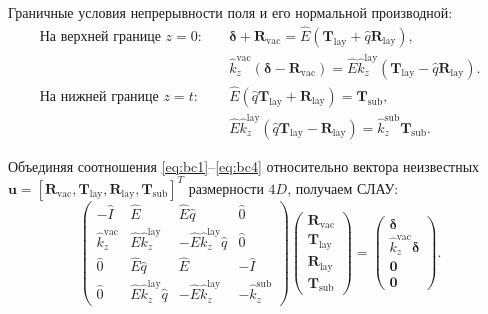 \documentclass[a4paper,11pt]{article}
\begin{document}
Граничные условия непрерывности поля и его нормальной производной:
\begin{align}
\text{На верхней границе } z = 0: & \quad \boldsymbol{\delta} + \mathbf{R}_{\text{vac}} = \hat{E} (\mathbf{T}_{\text{lay}} + \hat{q} \mathbf{R}_{\text{lay}}), \label{eq:bc1} \\
& \quad \hat{k}_{z}^{\text{vac}} (\boldsymbol{\delta} - \mathbf{R}_{\text{vac}}) = \hat{E} \hat{k}_{z}^{\text{lay}} (\mathbf{T}_{\text{lay}} - \hat{q} \mathbf{R}_{\text{lay}}). \label{eq:bc2} \\
\text{На нижней границе } z = t: & \quad \hat{E} (\hat{q} \mathbf{T}_{\text{lay}} + \mathbf{R}_{\text{lay}}) = \mathbf{T}_{\text{sub}}, \label{eq:bc3} \\
& \quad \hat{E} \hat{k}_{z}^{\text{lay}} (\hat{q} \mathbf{T}_{\text{lay}} - \mathbf{R}_{\text{lay}}) = \hat{k}_{z}^{\text{sub}} \mathbf{T}_{\text{sub}}. \label{eq:bc4}
\end{align}

Объединяя соотношения \eqref{eq:bc1}--\eqref{eq:bc4} относительно вектора неизвестных $\mathbf{u} = [\mathbf{R}_{\text{vac}}, \mathbf{T}_{\text{lay}}, \mathbf{R}_{\text{lay}}, \mathbf{T}_{\text{sub}}]^T$ размерности $4D$, получаем СЛАУ:
\begin{equation}
\begin{pmatrix}
-\hat{I} & \hat{E} & \hat{E}\hat{q} & \hat{0} \\
\hat{k}_z^{\text{vac}} & \hat{E}\hat{k}_z^{\text{lay}} & -\hat{E}\hat{k}_z^{\text{lay}}\hat{q} & \hat{0} \\
\hat{0} & \hat{E}\hat{q} & \hat{E} & -\hat{I} \\
\hat{0} & \hat{E}\hat{k}_z^{\text{lay}}\hat{q} & -\hat{E}\hat{k}_z^{\text{lay}} & -\hat{k}_z^{\text{sub}}
\end{pmatrix}
\begin{pmatrix}
\mathbf{R}_{\text{vac}} \\
\mathbf{T}_{\text{lay}} \\
\mathbf{R}_{\text{lay}} \\
\mathbf{T}_{\text{sub}}
\end{pmatrix}
=
\begin{pmatrix}
\boldsymbol{\delta} \\
\hat{k}_z^{\text{vac}} \boldsymbol{\delta} \\
\mathbf{0} \\
\mathbf{0}
\end{pmatrix}.
\label{eq:global_matrix_system}
\end{equation}
\end{document}
